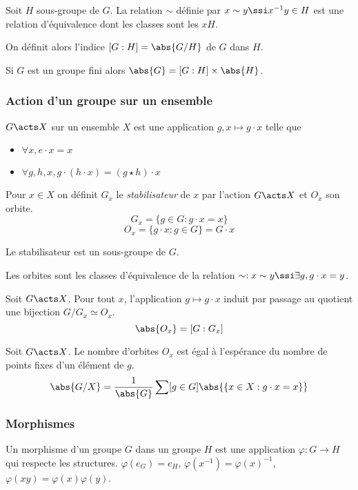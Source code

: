 \documentclass[a4paper,11pt,twocolumn]{article}\usepackage[landscape]{geometry}
\begin{document}
       Soit $H$ sous-groupe de $G$. La relation $\sim$ définie par $x\sim y\ssi x^{-1}y\in H$ est une relation d'équivalence dont les classes sont les $xH$.

      On définit alors l'indice $[G:H] = \abs{G/H}$ de $G$ dans $H$.

       Si $G$ est un groupe fini alors $\abs{G} = [G:H] \times \abs{H}$.

    \subsubsection{Action d'un groupe sur un ensemble}

       $G\acts X$ sur un ensemble $X$ est une application $g,x\mapsto g\cdot x$ telle que
      \begin{itemize}
        \item $\forall x, e\cdot x = x$
        \item $\forall g,h,x, g\cdot(h\cdot x) = (g\star h)\cdot x$
      \end{itemize}

       Pour $x\in X$ on définit $G_x$ le \emph{stabilisateur} de $x$ par l'action $G\acts X$ et $O_x$ son orbite.
      \[G_x = \{ g\in G: g\cdot x = x \}\]
      \[O_x = \{ g\cdot x: g\in G \} = G\cdot x\]

      Le stabilisateur est un sous-groupe de $G$.

      Les orbites sont les classes d'équivalence de la relation $\sim: x\sim y\ssi \exists g, g\cdot x = y$.

       Soit $G\acts X$. Pour tout $x$, l'application $g\mapsto g\cdot x$ induit par passage au quotient une bijection $G/G_x \simeq O_x$.
      \[\abs{O_x} = [G:G_x]\]

       Soit $G\acts X$. Le nombre d'orbites $O_x$ est égal à l'espérance du nombre de points fixes d'un élément de $g$.
      \[\abs{G/X} = \frac1{\abs{G}}\sum[g\in G]{\abs{\{x\in X: g\cdot x = x\}}}\]

    \subsubsection{Morphismes}

       Un morphisme d'un groupe $G$ dans un groupe $H$ est une application $\varphi:G\rightarrow H$ qui respecte les structures. $\varphi(e_G) = e_H$, $\varphi(x^{-1}) = \varphi(x)^{-1}$, $\varphi(xy) = \varphi(x)\varphi(y)$.
\end{document}
